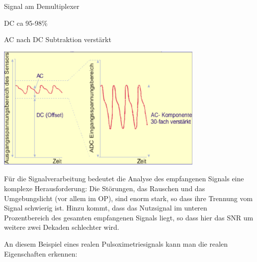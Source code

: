 \documentclass[a4paper]{article}
\begin{document}
\begin{multicols}{3}
  Signal am Demultiplexer

  \begin{itemize*}
    \item DC ca 95-98\%
    \item AC nach DC Subtraktion verstärkt
    \item \includegraphics[width=.5\linewidth]{Assets/Biosignalverarbeitung-pulsoxy-5.png}
  \end{itemize*}

  Für die Signalverarbeitung bedeutet die Analyse des empfangenen Signals
  eine komplexe Herausforderung: Die Störungen, das Rauschen und das
  Umgebungslicht (vor allem im OP), sind enorm stark, so dass ihre
  Trennung vom Signal schwierig ist. Hinzu kommt, dass das Nutzsignal im
  unteren Prozentbereich des gesamten empfangenen Signals liegt, so dass
  hier das SNR um weitere zwei Dekaden schlechter wird.

  An diesem Beispiel eines realen Pulsoximetriesignals kann man die realen
  Eigenschaften erkennen:


\end{multicols}
\end{document}
